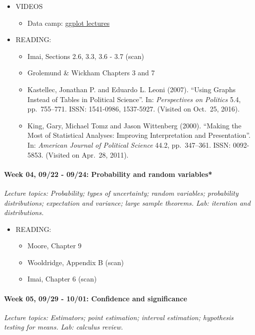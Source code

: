 \documentclass[11pt]{article}
\providecommand{\tightlist}{%
  \setlength{\itemsep}{0pt}\setlength{\parskip}{0pt}}
\begin{document}
\begin{itemize}
\tightlist
\item
  VIDEOS
  \begin{itemize}
  \tightlist
  \item
    Data camp:
    \href{https://www.datacamp.com/courses/data-visualization-with-ggplot2-1}{ggplot
    lectures}
  \end{itemize}
\item
  READING:
  \begin{itemize}
  \item Imai, Sections 2.6, 3.3, 3.6 - 3.7 (scan)
   \item Grolemund \& Wickham Chapters 3 and 7
  \item
    Kastellec, Jonathan P. and Eduardo L. Leoni (2007). ``Using Graphs
    Instead of Tables in Political Science''. In:
    \emph{Perspectives on Politics} 5.4, pp.~755--771. ISSN: 1541-0986,
    1537-5927. (Visited on Oct.~25, 2016).
  \item
    King, Gary, Michael Tomz and Jason Wittenberg (2000). ``Making the
    Most of Statistical Analyses: Improving Interpretation and
    Presentation''. In: \emph{American Journal of Political Science}
    44.2, pp.~347--361. ISSN: 0092-5853. (Visited on Apr.~28, 2011).
  \end{itemize}
\end{itemize}

\paragraph{Week 04, 09/22 - 09/24: Probability and random variables*\\}
\emph{Lecture topics: Probability; types of uncertainty; random variables; probability distributions; expectation and variance; large sample theorems. Lab: iteration and distributions.}\\

\begin{itemize}
\tightlist
\item
  READING:
  \begin{itemize}
  \tightlist
  \item
    Moore, Chapter 9
    \item
     Wooldridge, Appendix B (scan)
  \item
    Imai, Chapter 6 (scan)
  \end{itemize}
\end{itemize}

\paragraph{Week 05, 09/29 - 10/01: Confidence and significance\\}
\emph{Lecture topics: Estimators; point estimation; interval estimation; hypothesis testing for means. Lab: calculus review.}\\
\end{document}
